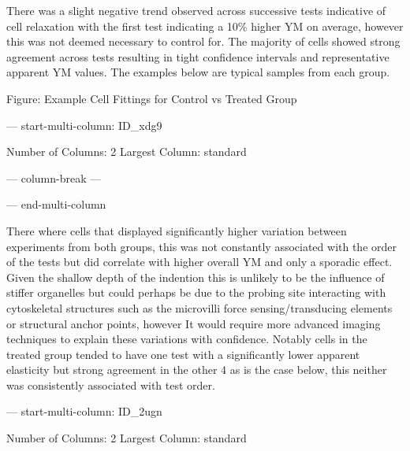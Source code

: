 \documentclass[
  paper=a4,
  ,captions=tableheading
]{scrartcl}
\makeatletter
\newenvironment{Shaded}{}{}
\newcommand{\NormalTok}[1]{#1}
\newcommand*\pandocbounded[1]{%
  \sbox\pandoc@box{#1}%
  \Gscale@div\@tempa{\textheight}{\dimexpr\ht\pandoc@box+\dp\pandoc@box\relax}%
  \Gscale@div\@tempb{\linewidth}{\wd\pandoc@box}%
  \ifdim\@tempb\p@<\@tempa\p@\let\@tempa\@tempb\fi%
  \ifdim\@tempa\p@<\p@\scalebox{\@tempa}{\usebox\pandoc@box}%
  \else\usebox{\pandoc@box}%
  \fi%
}
\makeatother
\begin{document}
There was a slight negative trend observed across successive tests
indicative of cell relaxation with the first test indicating a 10\%
higher YM on average, however this was not deemed necessary to control
for. The majority of cells showed strong agreement across tests
resulting in tight confidence intervals and representative apparent YM
values. The examples below are typical samples from each group.

Figure: Example Cell Fittings for Control vs Treated Group

--- start-multi-column: ID\_xdg9

\begin{Shaded}
\begin{Highlighting}[]
\NormalTok{Number of Columns: 2}
\NormalTok{Largest Column: standard}
\end{Highlighting}
\end{Shaded}

\pandocbounded{}

--- column-break ---

\pandocbounded{}

--- end-multi-column

There where cells that displayed significantly higher variation between
experiments from both groups, this was not constantly associated with
the order of the tests but did correlate with higher overall YM and only
a sporadic effect. Given the shallow depth of the indention this is
unlikely to be the influence of stiffer organelles but could perhaps be
due to the probing site interacting with cytoskeletal structures such as
the microvilli force sensing/transducing elements or structural anchor
points, however It would require more advanced imaging techniques to
explain these variations with confidence. Notably cells in the treated
group tended to have one test with a significantly lower apparent
elasticity but strong agreement in the other 4 as is the case below,
this neither was consistently associated with test order.

--- start-multi-column: ID\_2ugn

\begin{Shaded}
\begin{Highlighting}[]
\NormalTok{Number of Columns: 2}
\NormalTok{Largest Column: standard}
\end{Highlighting}
\end{Shaded}
\end{document}
